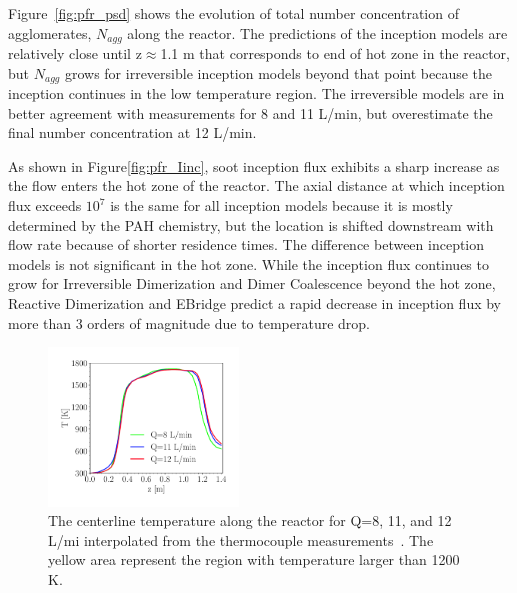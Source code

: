 Figure~\ref{fig:pfr_psd} shows the evolution of total number concentration of agglomerates, $N_{agg}$ along the reactor. The predictions of the inception models are relatively close until z$\approx$1.1 m that corresponds to end of hot zone in the reactor, but $N_{agg}$ grows for irreversible inception models beyond that point because the inception continues in the low temperature region. The irreversible models are in better agreement with  measurements for 8 and 11 L/min, but overestimate the final number concentration at 12 L/min.

As shown in Figure\ref{fig:pfr_Iinc}, soot inception flux exhibits a sharp increase as the flow enters the hot zone of the reactor. The axial distance at which inception flux exceeds $10^7$ is the same for all inception models because it is mostly determined by the PAH chemistry, but the location is shifted downstream with flow rate because of shorter residence times. The difference between inception models is not significant in the hot zone. While the inception flux continues to grow for Irreversible Dimerization and Dimer Coalescence beyond the hot zone, Reactive Dimerization and EBridge predict a rapid decrease in inception flux by more than 3 orders of magnitude due to temperature drop.


\begin{figure}[H]
	\centering
	\includegraphics[width=0.45\textwidth]{Figures/Results/PFR/temperature_combined.pdf}
	\caption{The centerline temperature along the reactor for Q=8, 11, and 12 L/mi interpolated from the thermocouple measurements~\citep{mei2019quantitative}. The yellow area represent the region with temperature larger than 1200 K.}
	\label{fig:pfr_temp} 
\end{figure}

